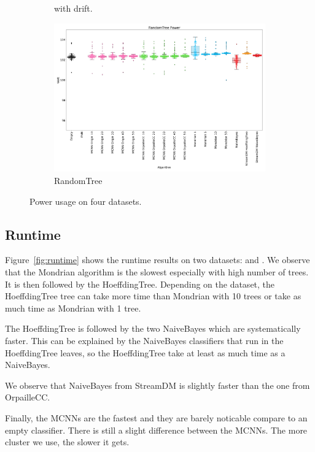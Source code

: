 \begin{figure}
\begin{subfigure}[t]{.5\linewidth}
		\caption{\banosdataset with drift.}
		\label{fig:power-drift}
	\end{subfigure}
	\begin{subfigure}[t]{.5\linewidth}
		\includegraphics[width=\linewidth]{figures/results/dataset_3_watt.png}
		\caption{RandomTree}
		\label{fig:power-dataset_3}
	\end{subfigure}
	\caption{Power usage on four datasets.}
	\label{fig:power}
\end{figure}

\subsection{Runtime}
Figure~\ref{fig:runtime} shows the runtime results on two datasets:
\banosdataset and \recofitdataset. We observe that the Mondrian algorithm is
the slowest especially with high number of trees.
It is then followed by the HoeffdingTree. Depending on the dataset, the
HoeffdingTree tree can take more time than Mondrian with 10 trees or take as
much time as Mondrian with 1 tree.

The HoeffdingTree is followed by the two NaiveBayes which are systematically
faster.  This can be explained by the NaiveBayes classifiers that run in the HoeffdingTree
leaves, so the HoeffdingTree take at least as much time as a NaiveBayes.

We observe that NaiveBayes from StreamDM is slightly faster than the one from
OrpailleCC.

Finally, the MCNNs are the fastest and they are barely noticable compare to an
empty classifier. There is still a slight difference between the MCNNs. The
more cluster we use, the slower it gets.


